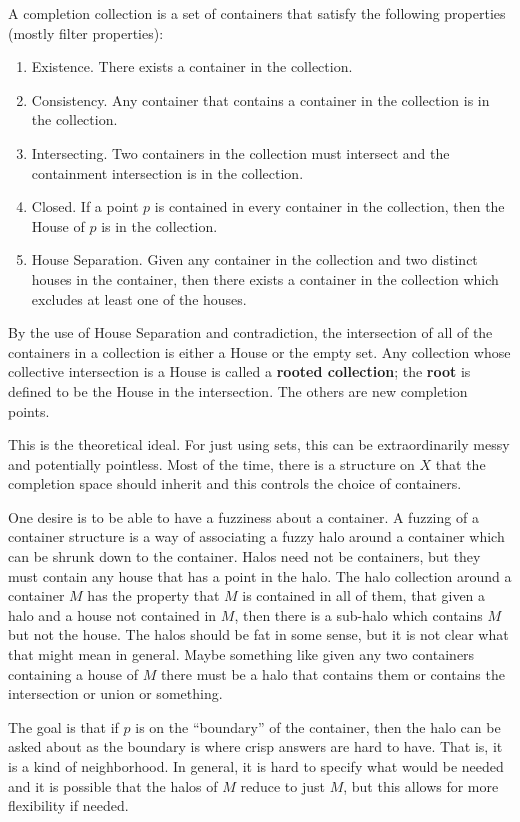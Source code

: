 \documentclass[12pt]{article}
\begin{document}
A completion collection is a set of containers that satisfy the following properties (mostly filter properties): 
\begin{enumerate}
    \item Existence. There exists a container in the collection. 
    \item Consistency. Any container that contains a container in the collection is in the collection. 
    \item Intersecting. Two containers in the collection must intersect and the containment intersection is in the collection. 
    \item Closed. If a point $p$ is contained in every container in the collection, then the House of $p$ is in the collection. 
    \item House Separation. Given any container in the collection and two distinct houses in the container, then there exists a container in the collection which excludes at least one of the houses. 
\end{enumerate}


By the use of House Separation and contradiction, the intersection of all of the containers in a collection is either a House or the empty set. Any collection whose collective intersection is a House is called a \textbf{rooted collection}; the \textbf{root} is defined to be the House in the intersection. The others are new completion points. 

This is the theoretical ideal. For just using sets, this can be extraordinarily messy and potentially pointless. Most of the time, there is a structure on $X$ that the completion space should inherit and this controls the choice of containers. 

One desire is to be able to have a fuzziness about a container. A fuzzing of a container structure is a way of associating a fuzzy halo around a container which can be shrunk down to the container. Halos need not be containers, but they must contain any house that has a point in the halo.  The halo collection around a container $M$ has the property that $M$ is contained in all of them, that given a halo and a house not contained in $M$, then there is a sub-halo which contains $M$ but not the house.  The halos should be fat in some sense, but it is not clear what that might mean in general. Maybe something like given any two containers containing a house of $M$ there must be a halo that contains them or contains the intersection or union or something. 

The goal is that if $p$ is on the ``boundary'' of the container, then the halo can be asked about as the boundary is where crisp answers are hard to have. That is, it is a kind of neighborhood. In general, it is hard to specify what would be needed and it is possible that the halos of $M$ reduce to just $M$, but this allows for more flexibility if needed. 
\end{document}
